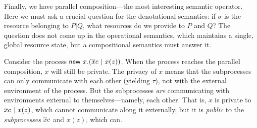 \documentclass{entcs}
\begin{document}
Finally, we have parallel composition---the most interesting semantic
operator.  Here we must ask a crucial question for the denotational
semantics: if $\sigma$ is the resource belonging to $P|Q$, what
resources do we provide to $P$ and $Q$?  The question does not come up
in the operational semantics, which maintains a single, global
resource state, but a compositional semantics must answer it.

Consider the process $\new x.(\ov{x}c\ |\ x(z))$.  When the process
reaches the parallel composition, $x$ will still be private.  The
privacy of $x$ means that the subprocesses can only communicate with
each other (yielding $\tau$), not with the external environment of the
process.  But the subprocesses \emph{are} communicating with
environments external to themselves---namely, each other.  That is,
$x$ is private to $\overline{x}c\ |\ x(z)$, which cannot communicate along
it externally, but it is \emph{public} to the \emph{subprocesses}
$\overline{x}c$ and $x(z)$, which can.
\end{document}
